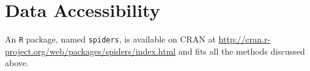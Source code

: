 \section{Data Accessibility}
\label{sec:accessibility}

An \texttt{R} package, named \texttt{spiders}, is available on CRAN at \url{http://cran.r-project.org/web/packages/spiders/index.html} and fits all the methods discussed above.  

